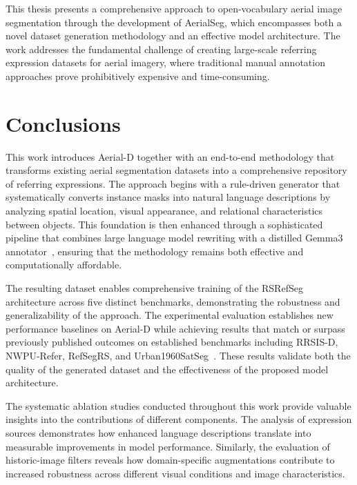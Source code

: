 \cleardoublepage
\label{chap:conclusion}

This thesis presents a comprehensive approach to open-vocabulary aerial image segmentation through the development of AerialSeg, which encompasses both a novel dataset generation methodology and an effective model architecture. The work addresses the fundamental challenge of creating large-scale referring expression datasets for aerial imagery, where traditional manual annotation approaches prove prohibitively expensive and time-consuming.

\section{Conclusions}

This work introduces Aerial-D together with an end-to-end methodology that transforms existing aerial segmentation datasets into a comprehensive repository of referring expressions. The approach begins with a rule-driven generator that systematically converts instance masks into natural language descriptions by analyzing spatial location, visual appearance, and relational characteristics between objects. This foundation is then enhanced through a sophisticated pipeline that combines large language model rewriting with a distilled Gemma3 annotator~\cite{gemma3}, ensuring that the methodology remains both effective and computationally affordable.

The resulting dataset enables comprehensive training of the RSRefSeg architecture across five distinct benchmarks, demonstrating the robustness and generalizability of the approach. The experimental evaluation establishes new performance baselines on Aerial-D while achieving results that match or surpass previously published outcomes on established benchmarks including RRSIS-D, NWPU-Refer, RefSegRS, and Urban1960SatSeg~\cite{yuan2023rrsis,yang2024large,hao2025urban1960satseg}. These results validate both the quality of the generated dataset and the effectiveness of the proposed model architecture.

The systematic ablation studies conducted throughout this work provide valuable insights into the contributions of different components. The analysis of expression sources demonstrates how enhanced language descriptions translate into measurable improvements in model performance. Similarly, the evaluation of historic-image filters reveals how domain-specific augmentations contribute to increased robustness across different visual conditions and image characteristics.

